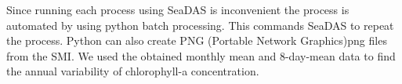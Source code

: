 Since running each process using SeaDAS is inconvenient the process is automated by using python batch processing. This commands SeaDAS to repeat the process. Python can also create PNG (Portable Network Graphics)png files from the SMI. We used the obtained monthly mean and 8-day-mean data to find the annual variability of chlorophyll-a concentration.
